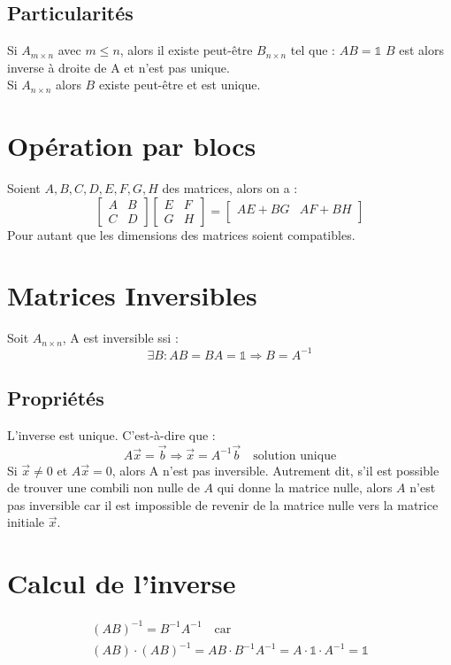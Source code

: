 \documentclass[a4paper]{book}
\begin{document}
\subsection{Particularités}
    Si $A_{m\times n}$ avec $ m \leq n$, alors il existe peut-être $B_{n\times n}$ tel que : $AB = \mathbb{1}$ $B$ est alors inverse à droite de A et n'est pas unique.
    \\ \indent Si $A_{n\times n}$ alors $B$ existe peut-être et est unique.
\section{Opération par blocs}
Soient $A,B,C,D,E,F,G,H$ des matrices, alors on a :
\begin{equation}
    \begin{bmatrix}
    A&B\\
    C&D
    \end{bmatrix}
    \begin{bmatrix}
    E&F\\
    G&H
    \end{bmatrix} =
    \begin{bmatrix}
    AE+BG&AF+BH\\
    \end{bmatrix}
\end{equation}
Pour autant que les dimensions des matrices soient compatibles.
\section{Matrices Inversibles}
Soit $A_{n\times n}$, A est inversible ssi :
\begin{equation}
    \exists B : AB = BA = \mathbb{1} \Rightarrow B = A^{-1}
\end{equation}
\subsection{Propriétés}
L'inverse est unique. C'est-à-dire que :
\begin{equation}
    A\Vec{x} = \Vec{b} \Rightarrow \Vec{x} = A^{-1}\Vec{b} \quad \text{solution unique}
\end{equation}
Si $\Vec{x}\ne 0$ et $A\Vec{x} = 0$, alors A n'est pas inversible. Autrement dit, s'il est possible de trouver une combili non nulle de $A$ qui donne la matrice nulle, alors $A$ n'est pas inversible car il est impossible de revenir de la matrice nulle vers la matrice initiale $\Vec{x}$. 
\section{Calcul de l'inverse}
\begin{gather}
    (AB)^{-1} = B^{-1}A^{-1} \quad \text{car} \\
    (AB)\cdot (AB)^{-1} = AB\cdot B^{-1}A^{-1} = A\cdot \mathbb{1} \cdot A^{-1} = \mathbb{1}
\end{gather}
\end{document}
